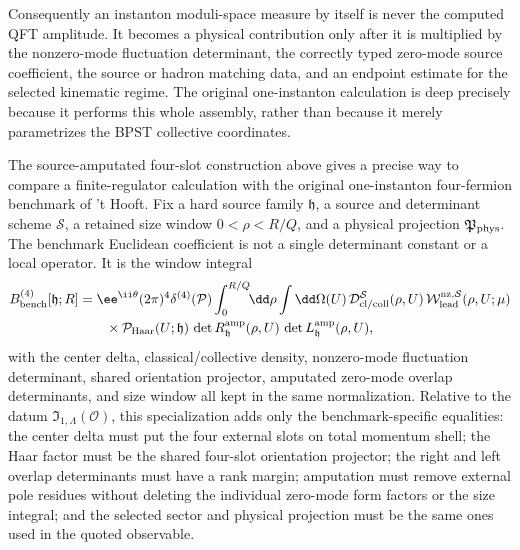 Consequently an instanton moduli-space measure by itself is never the
computed QFT amplitude.  It becomes a physical contribution only after it is
multiplied by the nonzero-mode fluctuation determinant, the correctly typed
zero-mode source coefficient, the source or hadron matching data, and an
endpoint estimate for the selected kinematic regime.  The original
one-instanton calculation is deep precisely because it performs this whole
assembly, rather than because it merely parametrizes the BPST collective
coordinates.

\begin{controlledapproximation}
\label{ca:thooft-four-fermion-benchmark-gate-ledger}
The source-amputated four-slot construction above gives a precise way to
compare a finite-regulator calculation with the original one-instanton
four-fermion benchmark of 't Hooft.  Fix a hard source family
\(\mathfrak h\), a source and determinant scheme \(\mathcal S\), a retained
size window \(0<\rho<R/Q\), and a physical projection
\(\mathfrak P_{\rm phys}\).  The benchmark Euclidean coefficient is not a
single determinant constant or a local operator.  It is the window integral
\begin{equation}
\begin{aligned}
  B_{\rm bench}^{(4)}[\mathfrak h;R]
  &=
  \ee^{\ii\theta}(2\pi)^4\delta^{(4)}(\mathcal P)
  \int_{0}^{R/Q}\!\!\dd\rho\int\dd\Omega(U)\,
  \mathcal D_{\rm cl/coll}^{\mathcal S}(\rho,U)\,
  \mathcal W_{\rm lead}^{\rm nz,\mathcal S}(\rho,U;\mu)        \\
  &\qquad{}\times
  \mathcal P_{\rm Haar}(U;\mathfrak h)\,
  \det R_{\mathfrak h}^{\rm amp}(\rho,U)\,
  \det L_{\mathfrak h}^{\rm amp}(\rho,U),
\end{aligned}
  \label{eq:thooft-four-fermion-benchmark-coefficient}
\end{equation}
with the center delta, classical/collective density, nonzero-mode
fluctuation determinant, shared orientation projector, amputated zero-mode
overlap determinants, and size window all kept in the same normalization.
Relative to the datum
\(\mathfrak I_{1,\Lambda}(\mathcal O)\), this specialization adds only the
benchmark-specific equalities: the center delta must put the four external
slots on total momentum shell; the Haar factor must be the shared four-slot
orientation projector; the right and left overlap determinants must have a
rank margin; amputation must remove external pole residues without deleting
the individual zero-mode form factors or the size integral; and the selected
sector and physical projection must be the same ones used in the quoted
observable.


\end{controlledapproximation}
